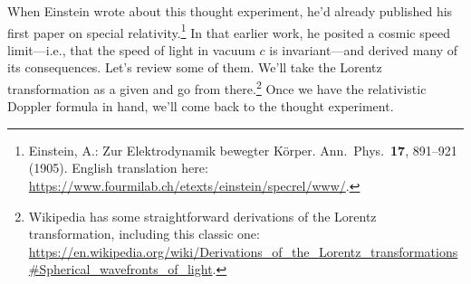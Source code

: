 \documentclass[12pt]{article}
\begin{document}
When Einstein wrote about this thought experiment, he'd already published his first paper on special relativity.\footnote{\label{fn:ep}Einstein, A.: Zur Elektrodynamik bewegter K\"orper. Ann.\ Phys.\ \textbf{17}, 891--921 (1905). English translation here: \url{https://www.fourmilab.ch/etexts/einstein/specrel/www/}.} In that earlier work, he posited a cosmic speed limit---i.e., that the speed of light in vacuum $c$ is invariant---and derived many of its consequences. Let's review some of them. We'll take the Lorentz transformation as a given and go from there.\footnote{Wikipedia has some straightforward derivations of the Lorentz transformation, including this classic one: \url{https://en.wikipedia.org/wiki/Derivations_of_the_Lorentz_transformations\#Spherical_wavefronts_of_light}.} Once we have the relativistic Doppler formula in hand, we'll come back to the thought experiment.
\end{document}
